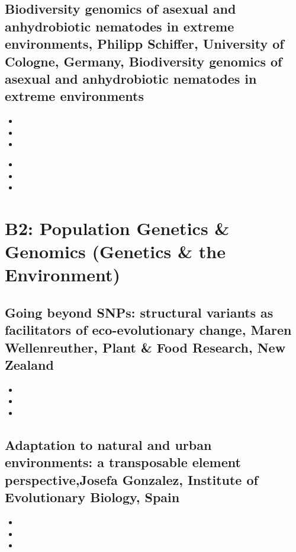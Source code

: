 \documentclass[document.tex]{subfiles}
\begin{document}
        \subsection{Biodiversity genomics of asexual and anhydrobiotic nematodes in extreme environments, Philipp Schiffer, University of Cologne, Germany, Biodiversity genomics of asexual and anhydrobiotic nematodes in extreme environments}
        \begin{itemize}
            \item 
            \item 
            \item 
            \end{itemize} 

       
            \begin{itemize}
                \item 
                \item 
                \item 
                \end{itemize} 
    



    \section{B2: Population Genetics & Genomics (Genetics & the Environment)}

        \subsection{Going beyond SNPs: structural variants as facilitators of eco-evolutionary change, Maren Wellenreuther, Plant & Food Research, New Zealand}
            \begin{itemize}
                \item 
                \item 
                \item 
                \end{itemize} 

        \subsection{Adaptation to natural and urban environments: a transposable element perspective,Josefa Gonzalez, Institute of Evolutionary Biology, Spain }
            \begin{itemize}
                \item 
                \item 
                \item 
                \end{itemize} 
\end{document}
